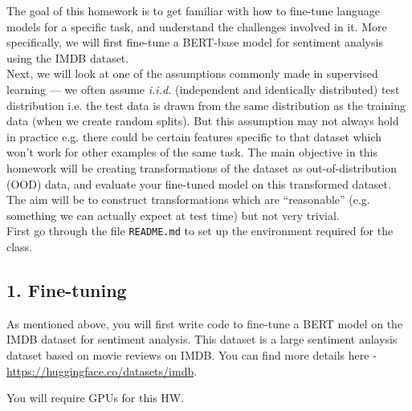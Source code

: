 \documentclass{article}
\theoremstyle{case}
\theoremstyle{definition}
\begin{document}
The goal of this homework is to get familiar with how to fine-tune language models for a specific task, and understand the challenges involved in it. More specifically, we will first fine-tune a BERT-base model for sentiment analysis using the IMDB dataset.\\


Next, we will look at one of the assumptions commonly made in supervised learning --- we often assume \emph{i.i.d.} (independent and identically distributed) test distribution i.e. the test data is drawn from the same distribution as the training data (when we create random splits). But this assumption may not always hold in practice e.g. there could be certain features specific to that dataset which won't work for other examples of the same task. The main objective in this homework will be creating transformations of the dataset as out-of-distribution (OOD) data, and evaluate your fine-tuned model on this transformed dataset. The aim will be to construct transformations which are ``reasonable'' (e.g. something we can actually expect at test time) but not very trivial.\\

First go through the file \texttt{README.md} to set up the environment required for the class.

\subsection*{1. Fine-tuning}

As mentioned above, you will first write code to fine-tune a BERT model on the IMDB dataset for sentiment analysis. This dataset is a large sentiment anlaysis dataset based on movie reviews on IMDB. You can find more details here - \url{https://huggingface.co/datasets/imdb}.

You will require GPUs for this HW.
\end{document}
